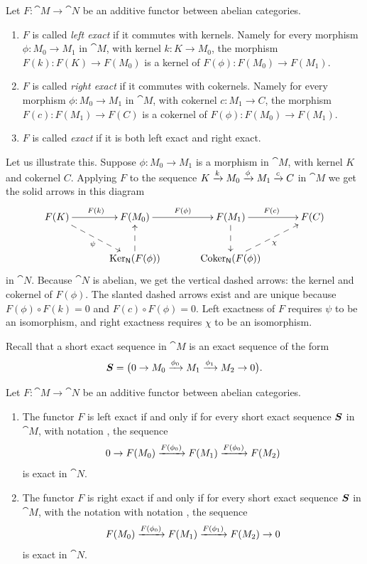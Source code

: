\begin{dfn}
Let $F : \cat{M} \to \cat{N}$ be an additive functor between abelian
categories. 
\begin{enumerate}
\item $F$ is called {\em left exact} if it commutes with kernels. 
Namely for every morphism $\phi : M_0 \to M_1$ in $\cat{M}$, with 
kernel $k : K \to M_0$, the morphism $F(k) : F(K) \to F(M_0)$ is 
a kernel of $F(\phi) : F(M_0) \to F(M_1)$.

\item $F$ is called {\em right exact} if it commutes with cokernels. 
Namely for every morphism $\phi : M_0 \to M_1$ in $\cat{M}$, with 
cokernel $c : M_1 \to C$, the morphism $F(c) : F(M_1) \to F(C)$ is 
a cokernel of $F(\phi) : F(M_0) \to F(M_1)$.

\item $F$ is called {\em exact} if it is both left exact and right exact.
\end{enumerate}
\end{dfn}

Let us illustrate this. Suppose $\phi : M_0 \to M_1$
is a morphism in $\cat{M}$, with  kernel $K$ and cokernel $C$. Applying $F$ to
the sequence  
$K \xrightarrow{k} M_0 \xrightarrow{\phi} M_1 \xrightarrow{c} C$
in $\cat{M}$ 
we get the solid arrows in this diagram 
\[ \UseTips  \xymatrix @C=8ex @R=6ex {
F(K)
\ar[r]^{F(k)}
\ar@{-->}[dr]_{\psi}
& 
F(M_0)
\ar[r]^{F(\phi)}
&
F(M_1)
\ar@{-->}[d]
\ar[r]^{F(c)}
&
F(C)
\\
&
\opn{Ker}_{\cat{N}}(F(\phi))
\ar@{-->}[u]
&
\opn{Coker}_{\cat{N}}(F(\phi))
\ar@{-->}[ur]_{\chi}
} \]
in $\cat{N}$. 
Because $\cat{N}$ is abelian, we get the vertical dashed arrows: the kernel 
and cokernel of $F(\phi)$. 
The slanted dashed arrows exist and are unique because 
$F(\phi) \circ F(k) = 0$ and $F(c) \circ F(\phi) = 0$. 
Left exactness of $F$ requires $\psi$ to be an isomorphism, and 
right exactness requires $\chi$ to be an isomorphism.

Recall that a short exact sequence in $\cat{M}$ is an exact sequence of the 
form 
\begin{equation} \label{eqn:4096}
\boldsymbol{S} = \bigl( 0 \to M_0 \xrightarrow{\phi_0} M_1 \xrightarrow{\phi_1} M_2 \to 0 \bigr) .
\end{equation}

\begin{prop}  \label{prop:1826}
Let $F : \cat{M} \to \cat{N}$ be an additive functor between abelian
categories. 
\begin{enumerate}
\item The functor $F$ is left exact if and only if 
for every short exact sequence $\boldsymbol{S}$
in $\cat{M}$, with notation \tup{(\ref{eqn:4096})}, the sequence 
\[ 0 \to F(M_0) \xrightarrow{F(\phi_0)} F(M_1) \xrightarrow{F(\phi_0)} F(M_2)  \]
is exact in $\cat{N}$.

\item The functor $F$ is right exact if and only if 
for every short exact sequence $\boldsymbol{S}$ in $\cat{M}$, with the notation 
with notation \tup{(\ref{eqn:4096})}, the sequence 
\[ F(M_0) \xrightarrow{F(\phi_0)} F(M_1) \xrightarrow{F(\phi_1)} F(M_2) \to 0 \]
is exact in $\cat{N}$.
\end{enumerate}
\end{prop}


